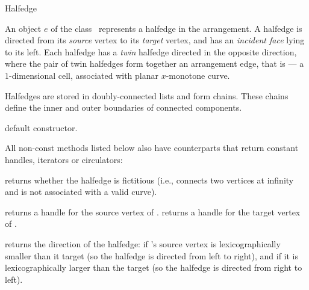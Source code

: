 
\ccRefPageBegin

\begin{ccRefClass}{Halfedge}

\ccThreeToTwo

\ccDefinition
An object $e$ of the class \ccRefName\ represents a halfedge in the
arrangement. A halfedge is directed from its \emph{source} vertex
to its \emph{target} vertex, and has an \emph{incident face} lying to
its left. Each halfedge has a \emph{twin} halfedge directed in the
opposite direction, where the pair of twin halfedges form together
an arrangement edge, that is --- a $1$-dimensional cell, associated
with planar $x$-monotone curve.

Halfedges are stored in doubly-connected lists and form chains. These
chains define the inner and outer boundaries of connected components.

\ccInheritsFrom

\ccCreation
{}

   {default constructor.}    	    
    
\ccAccessFunctions

All non-const methods listed below also have  counterparts
that return constant handles, iterators or circulators:

    {returns whether the halfedge is fictitious (i.e., connects two vertices at
     infinity and is not associated with a valid curve).}
    
    {returns a handle for the source vertex of \ccVar{}.}
\ccGlue
{}
    {returns a handle for the target vertex of \ccVar{}.}

    {returns the direction of the halfedge:  if
      \ccVar{}'s source vertex is lexicographically smaller than it
      target (so the halfedge is directed from left to right), and
       if it is lexicographically larger than
      the target (so the halfedge is directed from right to left).}


\end{ccRefClass}
